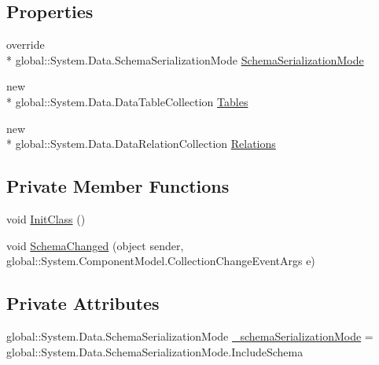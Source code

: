 \subsection*{Properties}
\begin{DoxyCompactItemize}
\item 
override \\*
global\-::\-System.\-Data.\-Schema\-Serialization\-Mode \hyperlink{class_asistencias__wpf_1_1_alumnos_data_set_ac9d0957f5b0991168a77c1f48fb92941}{Schema\-Serialization\-Mode}
\item 
new \\*
global\-::\-System.\-Data.\-Data\-Table\-Collection \hyperlink{class_asistencias__wpf_1_1_alumnos_data_set_aa4ac49198eb7a8cd5730501fd92eaa0c}{Tables}
\item 
new \\*
global\-::\-System.\-Data.\-Data\-Relation\-Collection \hyperlink{class_asistencias__wpf_1_1_alumnos_data_set_a0d4c947f0546161fe211244d255abcf8}{Relations}
\end{DoxyCompactItemize}
\subsection*{Private Member Functions}
\begin{DoxyCompactItemize}
\item 
void \hyperlink{class_asistencias__wpf_1_1_alumnos_data_set_a5b202656a9682929a0e3fe9bda2b6901}{Init\-Class} ()
\item 
void \hyperlink{class_asistencias__wpf_1_1_alumnos_data_set_a9d5e54c2f591f426d9cef8f1b11dbfdb}{Schema\-Changed} (object sender, global\-::\-System.\-Component\-Model.\-Collection\-Change\-Event\-Args e)
\end{DoxyCompactItemize}
\subsection*{Private Attributes}
\begin{DoxyCompactItemize}
\item 
global\-::\-System.\-Data.\-Schema\-Serialization\-Mode \hyperlink{class_asistencias__wpf_1_1_alumnos_data_set_a4e2747d090ad9f5a7cb90cc711d427eb}{\-\_\-schema\-Serialization\-Mode} = global\-::\-System.\-Data.\-Schema\-Serialization\-Mode.\-Include\-Schema
\end{DoxyCompactItemize}


